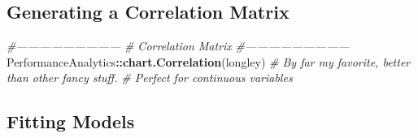 \documentclass[11pt,]{article}
\newenvironment{Shaded}{\begin{snugshade}}{\end{snugshade}}
\newcommand{\KeywordTok}[1]{\textcolor[rgb]{0.13,0.29,0.53}{\textbf{#1}}}
\newcommand{\CommentTok}[1]{\textcolor[rgb]{0.56,0.35,0.01}{\textit{#1}}}
\newcommand{\OperatorTok}[1]{\textcolor[rgb]{0.81,0.36,0.00}{\textbf{#1}}}
\newcommand{\NormalTok}[1]{#1}
\begin{document}
\normalsize

\subsection{Generating a Correlation
Matrix}\label{generating-a-correlation-matrix}

\tiny

\begin{Shaded}
\begin{Highlighting}[]
\CommentTok{#---------------------------}
\CommentTok{# Correlation Matrix}
\CommentTok{#---------------------------}
\NormalTok{  PerformanceAnalytics}\OperatorTok{::}\KeywordTok{chart.Correlation}\NormalTok{(longley)}
  \CommentTok{# By far my favorite, better than other fancy stuff.}
  \CommentTok{# Perfect for continuous variables}
\end{Highlighting}
\end{Shaded}

\normalsize

\subsection{Fitting Models}\label{fitting-models}

\tiny
\end{document}
